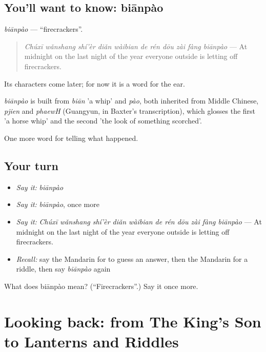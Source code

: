 \subsection*{You'll want to know: biānpào}
\emph{biānpào} — \textquotedblleft{}firecrackers\textquotedblright{}.

\begin{quote}
\emph{Chúxī wǎnshang shí'èr diǎn wàibian de rén dōu zài fàng biānpào} — At midnight on the last night of the year everyone outside is letting off firecrackers.
\end{quote}

Its characters come later; for now it is a word for the ear.

\begin{cousinweb}
\emph{biānpào} is built from \emph{biān} 'a whip' and \emph{pào}, both inherited from Middle Chinese, \emph{pjien} and \emph{phaewH} (Guangyun, in Baxter's transcription), which glosses the first 'a horse whip' and the second 'the look of something scorched'.
\end{cousinweb}

\begin{grammarlens}[title={What you've built}]
One more word for telling what happened.
\end{grammarlens}

\subsection*{Your turn}
\begin{itemize}
\raggedright
  \item \emph{Say it:} \emph{biānpào}
  \item \emph{Say it:} \emph{biānpào}, once more
  \item \emph{Say it:} \emph{Chúxī wǎnshang shí'èr diǎn wàibian de rén dōu zài fàng biānpào} — At midnight on the last night of the year everyone outside is letting off firecrackers.
  \item \emph{Recall:} say the Mandarin for to guess an answer, then the Mandarin for a riddle, then say \emph{biānpào} again
\end{itemize}

\begin{tcolorbox}[breakable,colback=teal!4,colframe=teal!35!black,title={Before you move on}]
What does biānpào mean? (\textquotedblleft{}Firecrackers\textquotedblright{}.) Say it once more.
\end{tcolorbox}
\section[(dialogue)]{Looking back: from The King's Son to Lanterns and Riddles}

